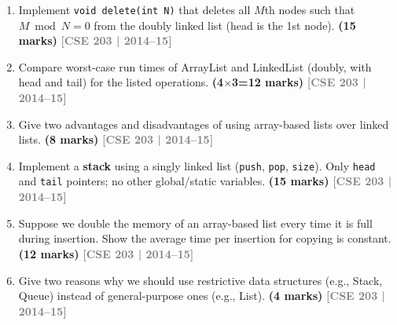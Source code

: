 \documentclass[12pt,a3paper]{article}
\newcommand{\yr}[1]{\hfill\textcolor{gray}{\small\textbf{[#1]}}}
\newcommand{\mk}[1]{\textcolor{orange!70!black}{\small\textbf{(#1 marks)}}}
\begin{document}
\begin{enumerate}
\item Implement \texttt{void delete(int N)} that deletes all $M$th nodes such
that $M \bmod N = 0$ from the doubly linked list (head is the 1st node). \mk{15}
\yr{CSE 203 | 2014--15}

\item Compare worst-case run times of ArrayList and LinkedList (doubly, with
head and tail) for the listed operations. \mk{4$\times$3=12}
\yr{CSE 203 | 2014--15}

\item Give two advantages and disadvantages of using array-based lists over
linked lists. \mk{8}
\yr{CSE 203 | 2014--15}

\item Implement a \textbf{stack} using a singly linked list (\texttt{push},
\texttt{pop}, \texttt{size}). Only \texttt{head} and \texttt{tail} pointers;
no other global/static variables. \mk{15}
\yr{CSE 203 | 2014--15}

\item Suppose we double the memory of an array-based list every time it is full
during insertion. Show the average time per insertion for copying is constant.
\mk{12}
\yr{CSE 203 | 2014--15}

\item Give two reasons why we should use restrictive data structures (e.g.,
Stack, Queue) instead of general-purpose ones (e.g., List). \mk{4}
\yr{CSE 203 | 2014--15}


\end{enumerate}
\end{document}
